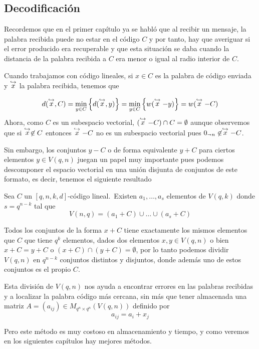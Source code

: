 \subsection{Decodificación}
Recordemos que en el primer capítulo ya se habló que al recibir un mensaje, la palabra recibida puede no estar en el código $C$ y por tanto, hay que averiguar si el error producido era recuperable y que esta situación se daba cuando la distancia de la palabra recibida a $C$ era menor o igual al radio interior de $C$.

Cuando trabajamos con código lineales, si $x\in C$ es la palabra de código enviada y $\stackrel{\hookrightarrow}{x}$ la palabra recibida, tenemos que

\[
	d(\stackrel{\hookrightarrow}{x}, C) = \min_{y\in C}\left\{d(\stackrel{\hookrightarrow}{x}, y)\right\}= \min_{y\in C}\left\{w(\stackrel{\hookrightarrow}{x}- y)\right\}=w(\stackrel{\hookrightarrow}{x}-C)
\]
Ahora, como $C$ es un subespacio vectorial, $(\stackrel{\hookrightarrow}{x}-C)\cap C=\emptyset$ aunque observemos que si $\stackrel{\hookrightarrow}{x}\not\in C$ entonces $\stackrel{\hookrightarrow}{x}-C$ no es un subespacio vectorial pues $0_{\shortrightarrow n}\not\in \stackrel{\hookrightarrow}{x}-C$.

Sin embargo, los conjuntos $y-C$ o de forma equivalente $y+C$ para ciertos elementos $y\in V(q,n)$ juegan un papel muy importante pues podemos descomponer el espacio vectorial en una unión disjunta de conjuntos de este formato, es decir, tenemos el siguiente resultado

\begin{lemma}
Sea $C$ un $[q, n, k, d]$-código lineal.\ Existen $a_1, \dots, a_s$ elementos de $V(q, k)$ donde $s=q^{n-k}$ tal que
	\[
		V(n, q) = (a_1+C)\cup\dots\cup (a_s+C)
	\]
\end{lemma}

Todos los conjuntos de la forma $x+C$ tiene exactamente los mismos elementos que $C$ que tiene $q^k$ elementos, dados dos elementos $x,y\in V(q,n)$ o bien $x+C=y+C$ o $(x+C)\cap (y+C)=\emptyset$, por lo tanto podemos dividir $V(q, n)$ en $q^{n-k}$ conjuntos distintos y disjuntos, donde además uno de estos conjuntos es el propio $C$.

Esta división de $V(q, n)$ nos ayuda a encontrar errores en las palabras recibidas y a localizar la palabra código más cercana, sin más que tener almacenada una matriz $A=(a_{ij})\in M_{q^n\times q^n}(V(q, n))$ definido por
\[
	a_{ij}=a_i+x_j
\]

Pero este método es muy costoso en almacenamiento y tiempo, y como veremos en los siguientes capítulos hay mejores métodos.